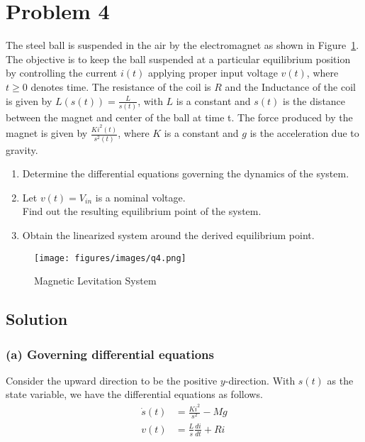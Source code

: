 \section*{Problem 4}

The steel ball is suspended in the air by the electromagnet as shown in Figure~\ref{fig:q4}.
The objective is to keep the ball suspended at a particular equilibrium position by controlling the current \(i(t)\) applying proper input voltage \(v(t)\), where \(t \geq 0\) denotes time.
The resistance of the coil is \(R\) and the Inductance of the coil is given by \(L(s(t)) = \frac{L}{s(t)}\), with \(L\) is a constant and \(s(t)\) is the distance between the magnet and center of the ball at time t.
The force produced by the magnet is given by \(\frac{K i^2(t)}{s^2(t)}\), where \(K\) is a constant and \(g\) is the acceleration due to gravity.

\begin{enumerate}[label= (\alph*)]
    \item Determine the differential equations governing the dynamics of the system.
    \item Let \(v(t) = V_{in}\) is a nominal voltage. \\
          Find out the resulting equilibrium point of the system.
    \item Obtain the linearized system around the derived equilibrium point.
\end{enumerate}

\begin{figure}[h]
    \centering
    \texttt{[image: figures/images/q4.png]}
    \caption{
        Magnetic Levitation System
    }\label{fig:q4}
\end{figure}

\subsection*{Solution}

\subsubsection*{(a) Governing differential equations}

Consider the upward direction to be the positive \(y\)-direction.
With \(s(t)\) as the state variable, we have the differential equations as follows.
\begin{align*}
    \dot s(t) & = \frac{Ki^2}{s^2} - Mg         \\
    v(t)      & = \frac{L}{s}\frac{di}{dt} + Ri
\end{align*}

